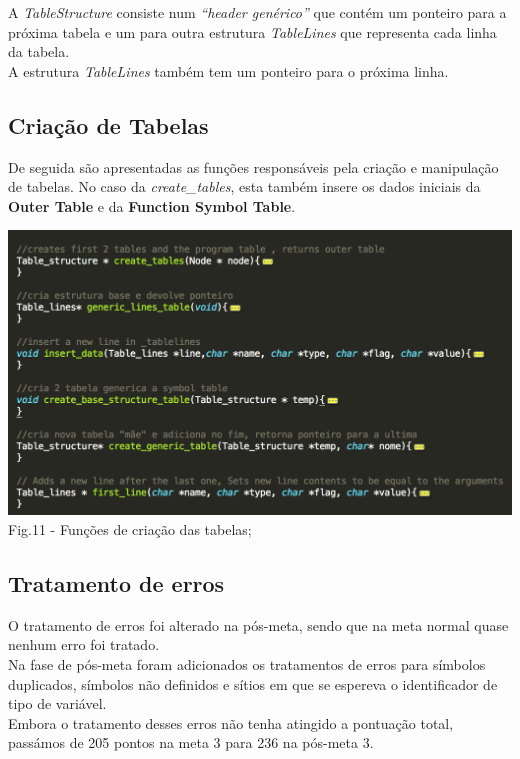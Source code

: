 \documentclass[12pt]{article}
\begin{document}
\indent A \textit{TableStructure} consiste num \textit{``header genérico''} que contém um ponteiro para a próxima tabela e um para outra estrutura \textit{TableLines} que representa cada linha da tabela.\\
\indent A estrutura \textit{TableLines} também tem um ponteiro para o próxima linha.

\newpage

\subsection{Criação de Tabelas}

\indent De seguida são apresentadas as funções responsáveis pela criação e manipulação de tabelas. No caso da \textit{create\_tables}, esta também insere os dados iniciais da \textbf{Outer Table} e da \textbf{Function Symbol Table}.

\begin{center}
\includegraphics[scale=0.8]{table_functions.png}\\
Fig.11 - Funções de criação das tabelas;
\end{center}

\newpage

\subsection{Tratamento de erros}

\indent O tratamento de erros foi alterado na pós-meta, sendo que na meta normal quase nenhum erro foi tratado.\\
\indent Na fase de pós-meta foram adicionados os tratamentos de erros para símbolos duplicados, símbolos não definidos e sítios em que se espereva o identificador de tipo de variável.\\
\indent Embora o tratamento desses erros não tenha atingido a pontuação total, passámos de 205 pontos na meta 3 para 236 na pós-meta 3.\\
\end{document}
